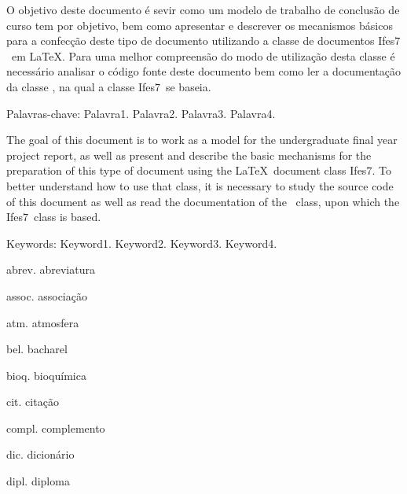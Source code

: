 \documentclass[times,english,brazil,oneside]{ifes7}
\newcommand{\ifestex}{\textsf{Ifes$7$}}
\begin{document}
\begin{resumo}
  O objetivo deste documento é sevir como um modelo de trabalho de
  conclusão de curso tem por objetivo, bem como apresentar e descrever
  os mecanismos básicos para a confecção deste tipo de documento
  utilizando a classe de documentos \ifestex\ em \LaTeX.
  Para uma melhor compreensão do modo de utilização desta classe é
  necessário analisar o código fonte deste documento bem como ler a
  documentação da classe \abnTeX, na qual a classe \ifestex\ se
  baseia.

  Palavras-chave: Palavra1. Palavra2. Palavra3. Palavra4.
\end{resumo}

\begin{resumo}[Abstract]
  \begin{otherlanguage}{english}
    The goal of this document is to work as a model for the
    undergraduate final year project report, as well as present and
    describe the basic mechanisms for the preparation of this type of
    document using the \LaTeX\ document class \ifestex.
    To better understand how to use that class, it is necessary to
    study the source code of this document as well as read the
    documentation of the \abnTeX\ class, upon which the \ifestex\
    class is based.

    Keywords: Keyword1. Keyword2. Keyword3. Keyword4.
  \end{otherlanguage}
\end{resumo}


\renewcommand{\listfigurename}{Lista de figuras}
\pdfbookmark[0]{\listfigurename}{lof}
\listoffigures*
\cleardoublepage


\listoftables*
\cleardoublepage


\listadequadros*
\cleardoublepage


\begin{abreviaturas}
\item[abrev.] abreviatura
\item[assoc.] associação
\item[atm.] atmosfera
\item[bel.] bacharel
\item[bioq.] bioquímica
\item[cit.] citação
\item[compl.] complemento
\item[dic.] dicionário
\item[dipl.] diploma
\end{abreviaturas}
\end{document}
